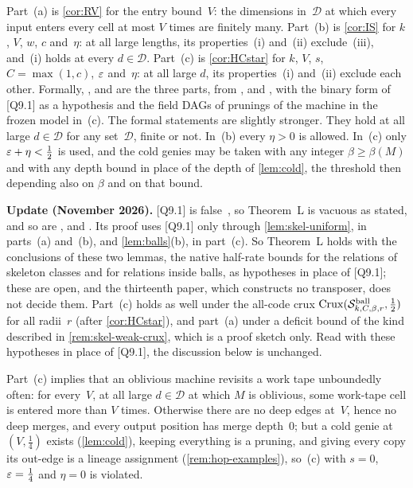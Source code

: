 \begin{outline}
Part~(a) is \cref{cor:RV} for the entry bound~$V$: the dimensions in~$\mathcal D$ at which every input enters every cell
at most $V$ times are finitely many. Part~(b) is \cref{cor:IS} for $k$, $V$, $w$, $c$ and~$\eta$: at all large lengths,
its properties~(i) and~(ii) exclude~(iii), and~(i) holds at every $d\in\mathcal D$. Part~(c) is \cref{cor:HCstar} for
$k$, $V$, $s$, $C=\max(1,c)$, $\varepsilon$ and~$\eta$: at all large $d$, its properties~(i) and~(ii) exclude each other.
Formally, ,  and  are the three parts, from
,  and , with the binary form
of [Q9.1] as a hypothesis and the field DAGs of prunings of the machine in the frozen model in~(c). The formal statements
are slightly stronger. They hold at all large $d\in\mathcal D$ for any set~$\mathcal D$, finite or not. In~(b) every
$\eta>0$ is allowed. In~(c) only $\varepsilon+\eta<\frac12$ is used, and the cold genies may be taken with any integer
$\beta\ge\beta(M)$ and with any depth bound in place of the depth of \cref{lem:cold}, the threshold then depending also
on $\beta$ and on that bound.
\end{outline}

\textbf{Update (November 2026).} [Q9.1] is false~\cite[Theorem~A and Corollary~A$'$]{StorageCodes2026}, so Theorem~L is
vacuous as stated, and so are ,  and . Its
proof uses [Q9.1] only through \cref{lem:skel-uniform}, in parts~(a) and~(b), and \cref{lem:balls}(b), in part~(c). So
Theorem~L holds with the conclusions of these two lemmas, the native half-rate bounds for the relations of skeleton
classes and for relations inside balls, as hypotheses in place of [Q9.1]; these are open, and the thirteenth paper,
which constructs no transposer, does not decide them. Part~(c) holds as well under the all-code crux
$\mathrm{Crux}(\mathcal S^{\mathrm{ball}}_{k,C,\beta,r},\frac12)$ for all radii~$r$ (after \cref{cor:HCstar}), and part~(a) under a deficit bound of
the kind described in \cref{rem:skel-weak-crux}, which is a proof sketch only. Read with these hypotheses in place of
[Q9.1], the discussion below is unchanged.

Part~(c) implies that an oblivious machine revisits a work tape unboundedly often: for every~$V$, at all large
$d\in\mathcal D$ at which $M$ is oblivious, some work-tape cell is entered more than $V$ times. Otherwise there are no
deep edges at~$V$, hence no deep merges, and every output position has merge depth~$0$; but a cold genie at
$(V,\frac14)$ exists (\cref{lem:cold}), keeping everything is a pruning, and giving every copy its out-edge is a lineage
assignment (\cref{rem:hop-examples}), so~(c) with $s=0$, $\varepsilon=\frac14$ and $\eta=0$ is violated.

